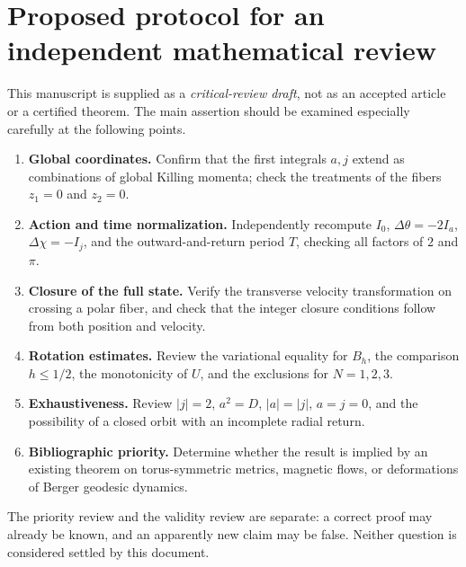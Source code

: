 \documentclass[11pt,a4paper]{article}
\theoremstyle{remark}\newtheorem{remark}[theorem]{Remark}
\begin{document}
\section{Proposed protocol for an independent mathematical review}
This manuscript is supplied as a \emph{critical-review draft}, not as an accepted article or a certified theorem. The main assertion should be examined especially carefully at the following points.
\begin{enumerate}[label=\arabic*.]
\item \textbf{Global coordinates.} Confirm that the first integrals $a,j$ extend as combinations of global Killing momenta; check the treatments of the fibers $z_1=0$ and $z_2=0$.
\item \textbf{Action and time normalization.} Independently recompute $I_0$, $\Delta\theta=-2I_a$, $\Delta\chi=-I_j$, and the outward-and-return period $T$, checking all factors of $2$ and $\pi$.
\item \textbf{Closure of the full state.} Verify the transverse velocity transformation on crossing a polar fiber, and check that the integer closure conditions follow from both position and velocity.
\item \textbf{Rotation estimates.} Review the variational equality for $B_h$, the comparison $h\le1/2$, the monotonicity of $U$, and the exclusions for $N=1,2,3$.
\item \textbf{Exhaustiveness.} Review $|j|=2$, $a^2=D$, $|a|=|j|$, $a=j=0$, and the possibility of a closed orbit with an incomplete radial return.
\item \textbf{Bibliographic priority.} Determine whether the result is implied by an existing theorem on torus-symmetric metrics, magnetic flows, or deformations of Berger geodesic dynamics.
\end{enumerate}
The priority review and the validity review are separate: a correct proof may already be known, and an apparently new claim may be false. Neither question is considered settled by this document.
\end{document}
